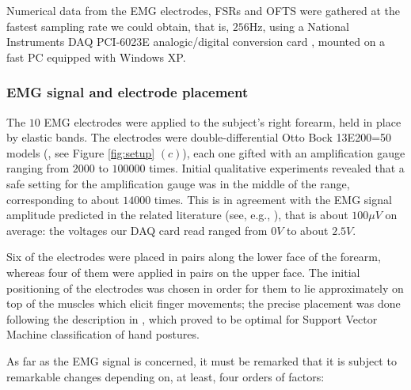 Numerical data from the EMG electrodes, FSRs and OFTS were gathered at
the fastest sampling rate we could obtain, that is, $256$Hz, using a
National Instruments DAQ PCI-6023E analogic/digital conversion card
\cite{nidaq}, mounted on a fast PC equipped with Windows XP.

\subsubsection{EMG signal and electrode placement}
\label{subsubsec:electrodes}

The $10$ EMG electrodes were applied to the subject's right forearm,
held in place by elastic bands. The electrodes were
double-differential Otto Bock 13E200=50 models (\cite{ottobock}, see
Figure \ref{fig:setup} $(c)$), each one gifted with an amplification
gauge ranging from $2000$ to $100000$ times. Initial qualitative
experiments revealed that a safe setting for the amplification gauge
was in the middle of the range, corresponding to about $14000$
times. This is in agreement with the EMG signal amplitude predicted in
the related literature (see, e.g., \cite{deluca}), that is about $100
\mu V$ on average: the voltages our DAQ card read ranged from $0V$ to
about $2.5V$.

Six of the electrodes were placed in pairs along the lower face of the
forearm, whereas four of them were applied in pairs on the upper
face. The initial positioning of the electrodes was chosen in order
for them to lie approximately on top of the muscles which elicit
finger movements; the precise placement was done following the
description in \cite{smagt}, which proved to be optimal for Support
Vector Machine classification of hand postures.

As far as the EMG signal is concerned, it must be remarked that it is
subject to remarkable changes depending on, at least, four orders of
factors:

